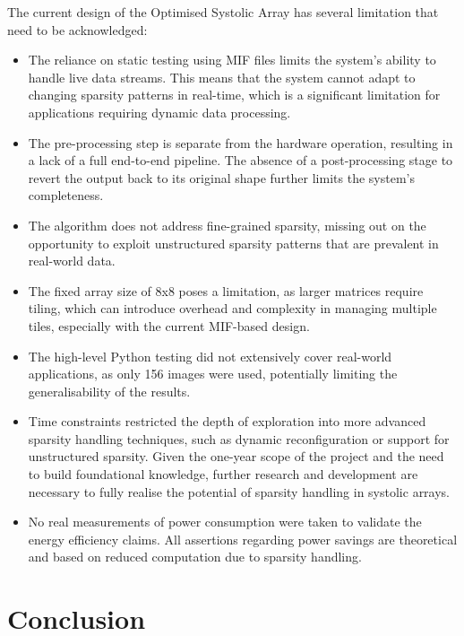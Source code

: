 \documentclass[12pt, a4paper, ukenglish]{article}
\begin{document}
    The current design of the Optimised Systolic Array has several limitation that need to be acknowledged:
    \begin{itemize}
        \item The reliance on static testing using MIF files limits the system's ability to handle live data streams. This means that the system cannot adapt to changing sparsity patterns in real-time, which is a significant limitation for applications requiring dynamic data processing.
        \item The pre-processing step is separate from the hardware operation, resulting in a lack of a full end-to-end pipeline. The absence of a post-processing stage to revert the output back to its original shape further limits the system's completeness.
        \item The algorithm does not address fine-grained sparsity, missing out on the opportunity to exploit unstructured sparsity patterns that are prevalent in real-world data.
        \item The fixed array size of 8x8 poses a limitation, as larger matrices require tiling, which can introduce overhead and complexity in managing multiple tiles, especially with the current MIF-based design.
        \item The high-level Python testing did not extensively cover real-world applications, as only 156 images were used, potentially limiting the generalisability of the results.
        \item Time constraints restricted the depth of exploration into more advanced sparsity handling techniques, such as dynamic reconfiguration or support for unstructured sparsity. Given the one-year scope of the project and the need to build foundational knowledge, further research and development are necessary to fully realise the potential of sparsity handling in systolic arrays.
        \item No real measurements of power consumption were taken to validate the energy efficiency claims. All assertions regarding power savings are theoretical and based on reduced computation due to sparsity handling.
    \end{itemize}

\section{Conclusion} \label{sec: conclusion}
\end{document}
